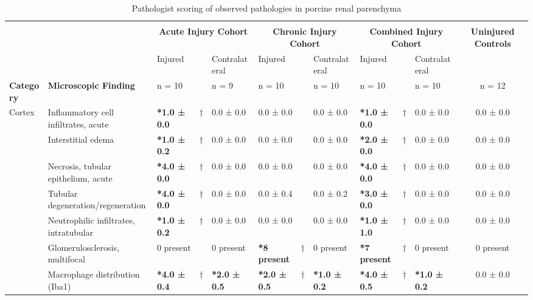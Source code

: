 
\begin{landscape}
    \singlespacing
    \fontsize{8.8}{10}\selectfont
    \centering
    \begin{longtable}{p{0.45in}p{1.70in}|lcl|lcl|lcl|c}
        \caption{Pathologist scoring of observed pathologies in porcine renal parenchyma}
        \label{tbl:histoQuant}\\
        \toprule\\
        &  & \multicolumn{3}{c|}{\textbf{Acute Injury Cohort}} & \multicolumn{3}{c|}{\textbf{Chronic Injury Cohort}} & \multicolumn{3}{c|}{\textbf{Combined Injury Cohort}} & \multirow{2}{*}{\textbf{Uninjured Controls}} \\
        \multicolumn{1}{c}{} & \multicolumn{1}{c|}{} & Injured &  & Contralateral & Injured &  & Contralateral & Injured &  & Contralateral &  \\
        \textbf{Category} & \textbf{Microscopic Finding} & n = 10 &  & n = 9 & n = 10 &  & n = 10 & n = 10 &  & n = 10 & n = 12 \\ 
        \midrule
        \endfirsthead
        \endhead
        \endlastfoot
        Cortex & Inflammatory cell infiltrates, acute & \textbf{*1.0 ± 0.0} & † & 0.0 ± 0.0 & 0.0 ± 0.0 &  & 0.0 ± 0.0 & \textbf{*1.0 ± 0.0} & † & 0.0 ± 0.0 & 0.0 ± 0.0 \\
        & Interstitial edema & \textbf{*1.0 ± 0.2} & † & 0.0 ± 0.0 & 0.0 ± 0.0 &  & 0.0 ± 0.0 & \textbf{*2.0 ± 0.0} & † & 0.0 ± 0.0 & 0.0 ± 0.0 \\
        & Necrosis, tubular epithelium, acute & \textbf{*4.0 ± 0.0} & † & 0.0 ± 0.0 & 0.0 ± 0.0 &  & 0.0 ± 0.0 & \textbf{*4.0 ± 0.0} & † & 0.0 ± 0.0 & 0.0 ± 0.0 \\
        & Tubular degeneration/regeneration & \textbf{*4.0 ± 0.0} & † & 0.0 ± 0.0 & 0.0 ± 0.4 &  & 0.0 ± 0.2 & \textbf{*3.0 ± 0.0} & † & 0.0 ± 0.0 & 0.0 ± 0.0 \\
        & Neutrophilic infiltrates, intratubular & \textbf{*1.0 ± 0.2} & † & 0.0 ± 0.0 & 0.0 ± 0.0 &  & 0.0 ± 0.0 & \textbf{*1.0 ± 1.0} & † & 0.0 ± 0.0 & 0.0 ± 0.0 \\
        & Glomerulosclerosis, multifocal & 0 present &  & 0 present & \textbf{*8 present} & † & 0 present & \textbf{*7 present} & † & 0 present & 0 present \\
        & Macrophage distribution (Iba1) & \textbf{*4.0 ± 0.4} & † & \textbf{*2.0 ± 0.5} & \textbf{*2.0 ± 0.5} & † & \textbf{*1.0 ± 0.2} & \textbf{*4.0 ± 0.5} & † & \textbf{*1.0 ± 0.2} & 0.0 ± 0.0 \\

\end{longtable}
\end{landscape}
